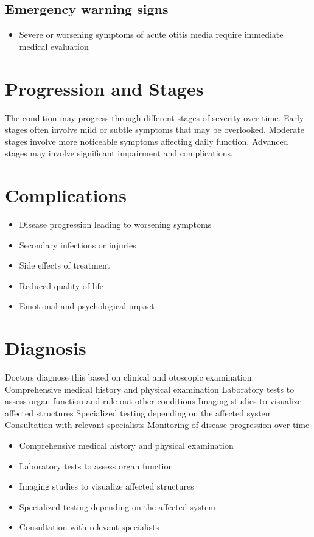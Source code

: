 \subsection{Emergency warning signs}
\begin{itemize}[noitemsep]
  \item Severe or worsening symptoms of acute otitis media require immediate medical evaluation
\end{itemize}
\section{Progression and Stages}
The condition may progress through different stages of severity over time. Early stages often involve mild or subtle symptoms that may be overlooked. Moderate stages involve more noticeable symptoms affecting daily function. Advanced stages may involve significant impairment and complications.
\section{Complications}
\begin{itemize}[noitemsep]
  \item Disease progression leading to worsening symptoms
  \item Secondary infections or injuries
  \item Side effects of treatment
  \item Reduced quality of life
  \item Emotional and psychological impact
\end{itemize}
\section{Diagnosis}
Doctors diagnose this based on clinical and otoscopic examination. Comprehensive medical history and physical examination Laboratory tests to assess organ function and rule out other conditions Imaging studies to visualize affected structures Specialized testing depending on the affected system Consultation with relevant specialists Monitoring of disease progression over time

\begin{itemize}[noitemsep]
  \item Comprehensive medical history and physical examination
  \item Laboratory tests to assess organ function
  \item Imaging studies to visualize affected structures
  \item Specialized testing depending on the affected system
  \item Consultation with relevant specialists
\end{itemize}

